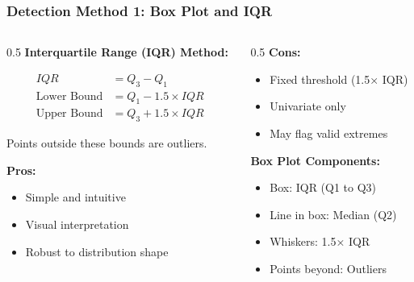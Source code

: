 \documentclass[aspectratio=169]{beamer}
\begin{document}
\begin{frame}
\frametitle{Detection Method 1: Box Plot and IQR}

\begin{columns}[T]
    \begin{column}{0.5\textwidth}
        \textbf{Interquartile Range (IQR) Method:}

        \begin{equation*}
        \begin{aligned}
        IQR &= Q_3 - Q_1 \\
        \text{Lower Bound} &= Q_1 - 1.5 \times IQR \\
        \text{Upper Bound} &= Q_3 + 1.5 \times IQR
        \end{aligned}
        \end{equation*}

        Points outside these bounds are outliers.

        \vspace{0.3cm}

        \textbf{Pros:}
        \begin{itemize}
            \item Simple and intuitive
            \item Visual interpretation
            \item Robust to distribution shape
        \end{itemize}
    \end{column}
    \begin{column}{0.5\textwidth}
        \textbf{Cons:}
        \begin{itemize}
            \item Fixed threshold (1.5× IQR)
            \item Univariate only
            \item May flag valid extremes
        \end{itemize}

        \vspace{0.3cm}

        \textbf{Box Plot Components:}
        \begin{itemize}
            \item Box: IQR (Q1 to Q3)
            \item Line in box: Median (Q2)
            \item Whiskers: 1.5× IQR
            \item Points beyond: Outliers
        \end{itemize}
    \end{column}
\end{columns}

\end{frame}
\end{document}
